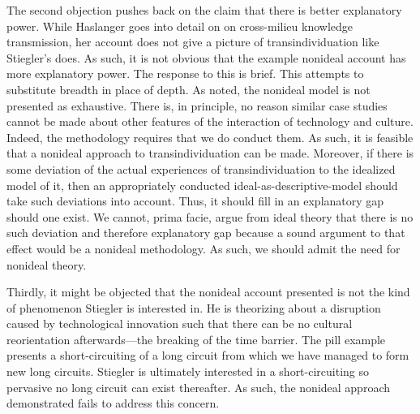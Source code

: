 \documentclass[letterpaper,notitlepage,12pt]{article}
\begin{document}
The second objection pushes back on the claim that there is better explanatory
power.
While Haslanger goes into detail on on cross-milieu knowledge transmission, her
account does not give a picture of transindividuation like Stiegler's does.
As such, it is not obvious that the example nonideal account has more
explanatory power.
The response to this is brief.
This attempts to substitute breadth in place of depth.
As noted, the nonideal model is not presented as exhaustive.
There is, in principle, no reason similar case studies cannot be made about
other features of the interaction of technology and culture.
Indeed, the methodology requires that we do conduct them.
As such, it is feasible that a nonideal approach to transindividuation can be
made.
Moreover, if there is some deviation of the actual experiences of
transindividuation to the idealized model of it, then an appropriately conducted
ideal-as-descriptive-model should take such deviations into account.
Thus, it should fill in an explanatory gap should one exist.
We cannot, prima facie, argue from ideal theory that there is no such deviation
and therefore explanatory gap because a sound argument to that effect would be a
nonideal methodology.
As such, we should admit the need for nonideal theory.

Thirdly, it might be objected that the nonideal account presented is not the
kind of phenomenon Stiegler is interested in.
He is theorizing about a disruption caused by technological innovation such that
there can be no cultural reorientation afterwards---the breaking of the time
barrier.
The pill example presents a short-circuiting of a long circuit from which we have
managed to form new long circuits.
Stiegler is ultimately interested in a short-circuiting so pervasive no long
circuit can exist thereafter.
As such, the nonideal approach demonstrated fails to address this concern.
\end{document}
